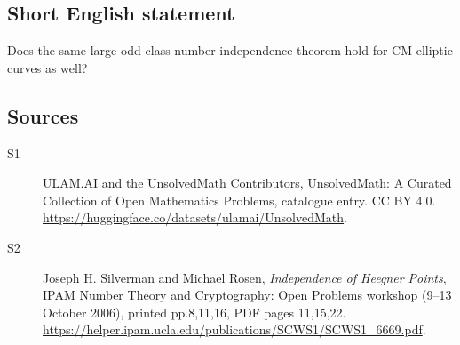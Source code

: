 \documentclass[11pt]{article}
\begin{document}
\subsection{Short English statement}
Does the same large-odd-class-number independence theorem hold for CM elliptic curves as well?
\subsection{Sources}
\begin{description}
\item[\hypertarget{source:statement:1}{S1}] ULAM.AI and the UnsolvedMath Contributors, UnsolvedMath: A Curated Collection of Open Mathematics Problems, catalogue entry. CC BY 4.0. \url{https://huggingface.co/datasets/ulamai/UnsolvedMath}.
\item[\hypertarget{source:statement:2}{S2}] Joseph H. Silverman and Michael Rosen, \emph{Independence of Heegner Points}, IPAM Number Theory and Cryptography: Open Problems workshop (9--13 October 2006), printed pp.8,11,16, PDF pages 11,15,22. \url{https://helper.ipam.ucla.edu/publications/SCWS1/SCWS1_6669.pdf}.
\end{description}
\label{end:statement}
\end{document}
